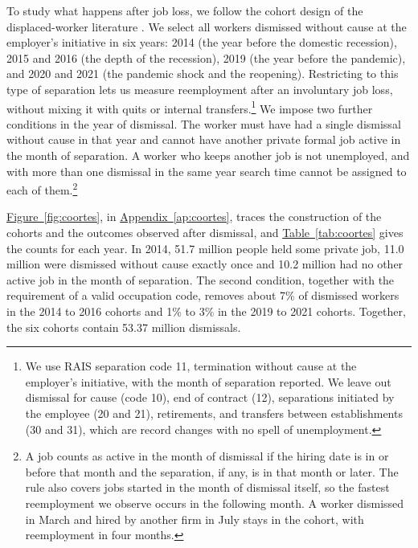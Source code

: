 \documentclass[11pt,a4paper]{article}
\let\citeporig\citep
\renewcommand{\citep}[1]{{\color{citeblue}\citeporig{#1}}}
\begin{document}
To study what happens after job loss, we follow the cohort design of the displaced-worker literature \citep{jacobson1993, neal1995, gerard2021}. We select all workers dismissed without cause at the employer's initiative in six years: 2014 (the year before the domestic recession), 2015 and 2016 (the depth of the recession), 2019 (the year before the pandemic), and 2020 and 2021 (the pandemic shock and the reopening). Restricting to this type of separation lets us measure reemployment after an involuntary job loss, without mixing it with quits or internal transfers.\footnote{We use RAIS separation code 11, termination without cause at the employer's initiative, with the month of separation reported. We leave out dismissal for cause (code 10), end of contract (12), separations initiated by the employee (20 and 21), retirements, and transfers between establishments (30 and 31), which are record changes with no spell of unemployment.} We impose two further conditions in the year of dismissal. The worker must have had a single dismissal without cause in that year and cannot have another private formal job active in the month of separation. A worker who keeps another job is not unemployed, and with more than one dismissal in the same year search time cannot be assigned to each of them.\footnote{A job counts as active in the month of dismissal if the hiring date is in or before that month and the separation, if any, is in that month or later. The rule also covers jobs started in the month of dismissal itself, so the fastest reemployment we observe occurs in the following month. A worker dismissed in March and hired by another firm in July stays in the cohort, with reemployment in four months.}

\hyperref[fig:coortes]{Figure~\ref*{fig:coortes}}, in \hyperref[ap:coortes]{Appendix~\ref*{ap:coortes}}, traces the construction of the cohorts and the outcomes observed after dismissal, and \hyperref[tab:coortes]{Table~\ref*{tab:coortes}} gives the counts for each year. In 2014, 51.7 million people held some private job, 11.0 million were dismissed without cause exactly once and 10.2 million had no other active job in the month of separation. The second condition, together with the requirement of a valid occupation code, removes about 7\% of dismissed workers in the 2014 to 2016 cohorts and 1\% to 3\% in the 2019 to 2021 cohorts. Together, the six cohorts contain 53.37 million dismissals.

\begin{table}[!htb]
\centering
\caption{Construction of the cohorts of workers dismissed without cause}
\label{tab:coortes}

\end{table}
\end{document}
